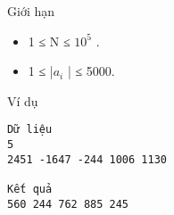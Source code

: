 Giới hạn  
\begin{itemize}
	\item     1 ≤ N ≤ $10^{5}$    .   
	\item     1 ≤ |$a_{i}$    | ≤ 5000.   
\end{itemize}
   Ví dụ  
\begin{verbatim}
Dữ liệu
5
2451 -1647 -244 1006 1130

Kết quả
560 244 762 885 245	
\end{verbatim}